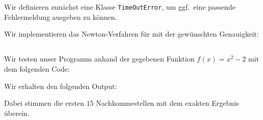 \section{}





\subsection{}

Wir definieren zunächst eine Klasse \texttt{TimeOutError}, um ggf.\ eine passende Fehlermeldung ausgeben zu können.



Wir implementieren das Newton-Verfahren für mit der gewünschten Genauigkeit:







\subsection{}

Wir testen unser Programm anhand der gegebenen Funktion $f(x) = x^2 - 2$ mit dem folgenden Code:



Wir erhalten den folgenden Output:


Dabei stimmen die ersten $15$ Nachkommestellen mit dem exakten Ergebnis überein.
